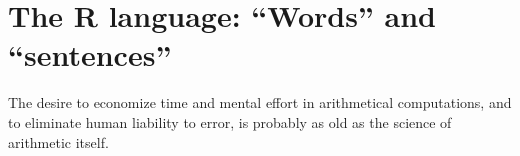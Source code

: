 \documentclass[krantz2]{krantz}\usepackage{knitr}
\begin{document}
%
%
%
%

\mainmatter







\chapter{The R language: ``Words'' and ``sentences''}\label{chap:R:as:calc}

\begin{VF}
The desire to economize time and mental effort in arithmetical computations, and to eliminate human liability to error, is probably as old as the science of arithmetic itself.

\nocite{Aiken1964}
\end{VF}

\end{document}
